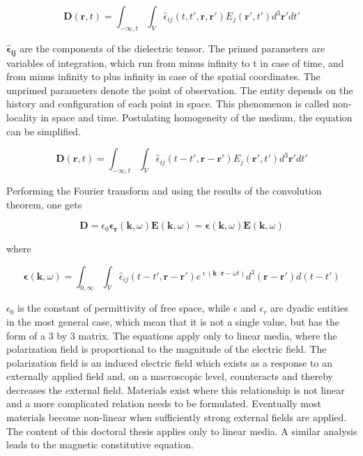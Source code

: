 \documentclass[a4paper,11pt]{thesis}
\begin{document}
\begin{equation}
    \mathbf{D}(\mathbf{r},t)=\int_{-\infty,t}\int_V\hat{\epsilon}_{ij}(t,t',\mathbf{r},\mathbf{r'}) E_j(\mathbf{r'},t')d^3\mathbf{r'}dt'
\end{equation}

$\mathbf{\hat{\epsilon}_{ij}}$ are the components of the dielectric tensor. The primed parameters are  variables of integration, which run from minus infinity to t in case of time, and from minus infinity to plus infinity in case of the spatial coordinates. The unprimed parameters denote the point of observation. The entity depends on the history and configuration of each point in space. This phenomenon is called non-locality in space and time. Postulating homogeneity of the medium, the equation can be simplified.

\begin{equation}
    \mathbf{D}(\mathbf{r},t)=\int_{-\infty,t}\int_V\hat{\epsilon}_{ij}(t-t',\mathbf{r}-\mathbf{r'}) E_j(\mathbf{r'},t')d^3\mathbf{r'}dt'
\end{equation}

Performing the Fourier transform and using the results of the convolution theorem, one gets

\begin{equation}
\mathbf{D} = \epsilon_0 \mathbf{\epsilon_r}(\mathbf{k},\omega) \mathbf{E}(\mathbf{k},\omega) = \mathbf{\epsilon}(\mathbf{k},\omega) \mathbf{E}(\mathbf{k},\omega)\label{constitutive_1_vacuum}
\end{equation}

where

\begin{equation}
    \mathbf{\epsilon}(\mathbf{k},\omega)=\int_{0,\infty}\int_V\hat{\epsilon}_{ij}(t-t',\mathbf{r}-\mathbf{r'}) e^{\imath (\mathbf{k}\cdot \mathbf{r}- \omega t)}d^3\mathbf{(r-r')}d(t-t')
\end{equation}

$\epsilon_0$ is the constant of permittivity of free space, while $\epsilon$ and $\epsilon_r$
are dyadic entities in the most general case, which mean that it is not a single value, but has the form of a 3 by 3 matrix. The equations apply
only to linear media, where the polarization field is proportional
to the magnitude of the electric field. The polarization field is an induced electric field which exists as a response to an externally applied field and, on a macroscopic level, counteracts and thereby decreases the external field. Materials exist where this relationship is not linear and a more complicated relation needs to be formulated. Eventually most materials become non-linear when
sufficiently strong external fields are applied. The content of this doctoral
thesis applies only to linear media. A similar analysis leads to the magnetic constitutive equation.
\end{document}
